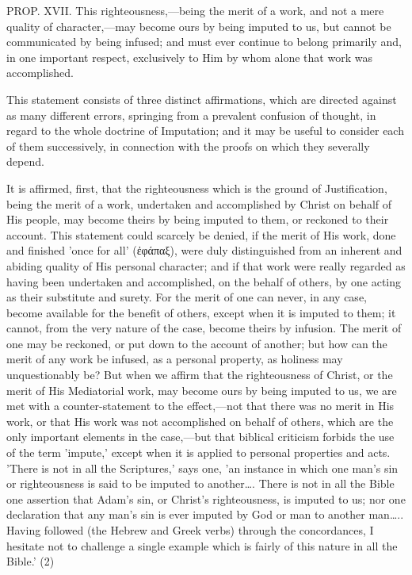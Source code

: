 \documentclass[
]{book}
\begin{document}
PROP. XVII. This righteousness,---being the merit of a work, and not a mere quality of character,---may become ours by being imputed to us, but cannot be communicated by being infused; and must ever continue to belong primarily and, in one important respect, exclusively to Him by whom alone that work was accomplished.

This statement consists of three distinct affirmations, which are directed against as many different errors, springing from a prevalent confusion of thought, in regard to the whole doctrine of Imputation; and it may be useful to consider each of them successively, in connection with the proofs on which they severally depend.

It is affirmed, first, that the righteousness which is the ground of Justification, being the merit of a work, undertaken and accomplished by Christ on behalf of His people, may become theirs by being imputed to them, or reckoned to their account. This statement could scarcely be denied, if the merit of His work, done and finished 'once for all' (ἐφάπαξ), were duly distinguished from an inherent and abiding quality of His personal character; and if that work were really regarded as having been undertaken and accomplished, on the behalf of others, by one acting as their substitute and surety. For the merit of one can never, in any case, become available for the benefit of others, except when it is imputed to them; it cannot, from the very nature of the case, become theirs by infusion. The merit of one may be reckoned, or put down to the account of another; but how can the merit of any work be infused, as a personal property, as holiness may unquestionably be? But when we affirm that the righteousness of Christ, or the merit of His Mediatorial work, may become ours by being imputed to us, we are met with a counter-statement to the effect,---not that there was no merit in His work, or that His work was not accomplished on behalf of others, which are the only important elements in the case,---but that biblical criticism forbids the use of the term 'impute,' except when it is applied to personal properties and acts. 'There is not in all the Scriptures,' says one, 'an instance in which one man's sin or righteousness is said to be imputed to another\ldots. There is not in all the Bible one assertion that Adam's sin, or Christ's righteousness, is imputed to us; nor one declaration that any man's sin is ever imputed by God or man to another man\ldots.. Having followed (the Hebrew and Greek verbs) through the concordances, I hesitate not to challenge a single example which is fairly of this nature in all the Bible.' (2)
\end{document}
